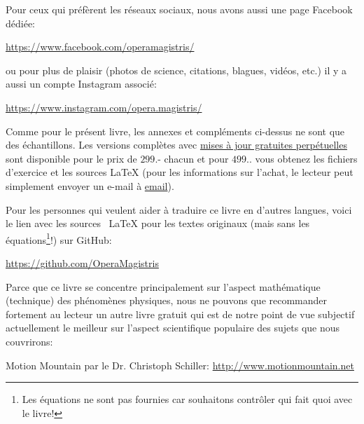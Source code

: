 	Pour ceux qui pr\'efèrent les r\'eseaux sociaux, nous avons aussi une page Facebook d\'edi\'ee:
	\begin{center}
		\faFacebook{} \href{https://www.facebook.com/operamagistris/}{https://www.facebook.com/operamagistris/}
	\end{center}
	ou pour plus de plaisir (photos de science, citations, blagues, vid\'eos, etc.) il y a aussi un compte Instagram associ\'e:
	\begin{center}
		\faInstagram{} \href{https://www.instagram.com/opera.magistris/}{https://www.instagram.com/opera.magistris/}
	\end{center}
	Comme pour le pr\'esent livre, les annexes et compl\'ements ci-dessus ne sont que des \'echantillons. Les versions complètes avec \underline{mises à jour gratuites perp\'etuelles} sont disponible pour le prix de $299$.- chacun et pour $499$.. vous obtenez les fichiers d'exercice et les sources \LaTeX{} (pour les informations sur l'achat, le lecteur peut simplement envoyer un e-mail à {\href{mailto:info@sciences.ch}{{\color{blue}email}}}).
	
	Pour les personnes qui veulent aider à traduire ce livre en d'autres langues, voici le lien avec les sources \ LaTeX {} pour les textes originaux (mais sans les \'equations\footnote{Les \'equations ne sont pas fournies car souhaitons contrôler qui fait quoi avec le livre!}!) sur GitHub:
	\begin{center}
		\faGithubSquare{} \href{https://github.com/OperaMagistris}{https://github.com/OperaMagistris}
	\end{center}
	Parce que ce livre se concentre principalement sur l'aspect math\'ematique (technique) des ph\'enomènes physiques, nous ne pouvons que recommander fortement au lecteur un autre livre gratuit qui est de notre point de vue subjectif actuellement le meilleur sur l'aspect scientifique populaire des sujets que nous couvrirons:
	\begin{center}
	Motion Mountain par le Dr. Christoph Schiller: \url{http://www.motionmountain.net}
	\end{center}

